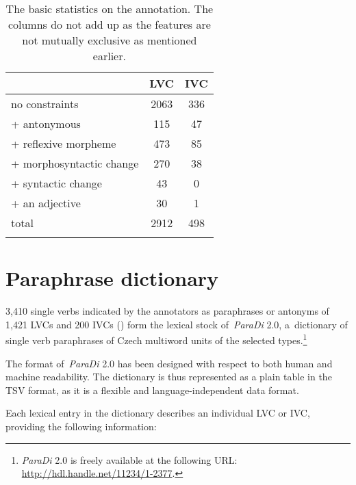 \documentclass[output=paper
,modfonts
,nonflat]{langsci/langscibook}
\begin{document}
\begin{table}[tb]
	\centering
	\begin{tabular}{lcc}
		\lsptoprule
		                       & LVC   & IVC \\ \midrule
		no constraints         & 2063  &  336 \\ \hline
		 + antonymous          &  115  &     47 \\
		 + reflexive morpheme  &  473  &     85 \\ 
		 + morphosyntactic change      &  270  &  38 \\ 
		 + syntactic change      &    43  &    0 \\  
		 + an adjective        &   30  &   1 \\ \hline
		total                  & 2912   & 498 \\ \lspbottomrule
	\end{tabular}
	\caption{The basic statistics on the annotation. The columns
		do not add up as the features are not mutually exclusive as 
		mentioned earlier.}
	\label{fig:annotation}
\end{table}


\section{Paraphrase dictionary}
\label{results}
3,410 single verbs indicated by the annotators as paraphrases or antonyms of 
1,421 LVCs and 200 IVCs () form the lexical stock 
of~\emph{ParaDi} 2.0, a~dictionary of single verb paraphrases of Czech multiword 
units of the selected types.\footnote{\emph{ParaDi} 2.0 is freely available at 
the following URL: \url{http://hdl.handle.net/11234/1-2377}.} 

The format of~\emph{ParaDi} 2.0 has been designed with respect to both human 
and machine readability. The dictionary is thus represented as a plain table 
in the TSV format, as it is a flexible and language-independent data format.

Each lexical entry in the dictionary describes an individual LVC or IVC,
providing the following information:
\end{document}
